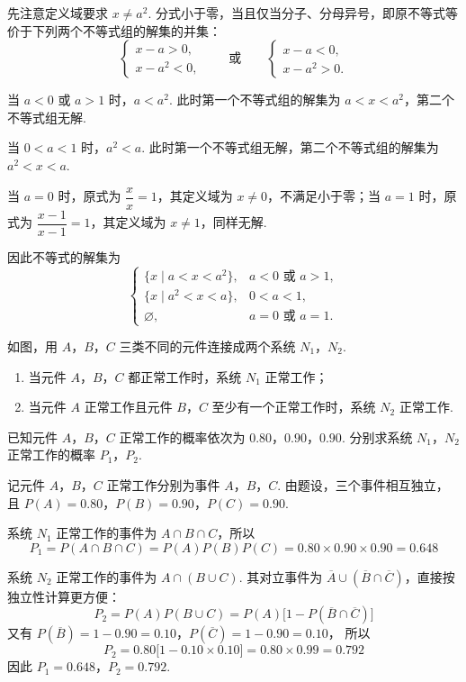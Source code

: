 \begin{solution}
先注意定义域要求 \(x\ne a^2\). 分式小于零，当且仅当分子、分母异号，即原不等式等价于下列两个不等式组的解集的并集：
\[
\begin{cases}
x-a>0,\\
x-a^2<0,
\end{cases}
\qquad\text{或}\qquad
\begin{cases}
x-a<0,\\
x-a^2>0.
\end{cases}
\]

当 \(a<0\) 或 \(a>1\) 时，\(a<a^2\). 此时第一个不等式组的解集为 \(a<x<a^2\)，第二个不等式组无解.

当 \(0<a<1\) 时，\(a^2<a\). 此时第一个不等式组无解，第二个不等式组的解集为 \(a^2<x<a\).

当 \(a=0\) 时，原式为 \(\dfrac{x}{x}=1\)，其定义域为 \(x\ne0\)，不满足小于零；当 \(a=1\) 时，原式为 \(\dfrac{x-1}{x-1}=1\)，其定义域为 \(x\ne1\)，同样无解.

因此不等式的解集为
\[
\begin{cases}
\{x\mid a<x<a^2\},&a<0\text{ 或 }a>1,\\
\{x\mid a^2<x<a\},&0<a<1,\\
\varnothing,&a=0\text{ 或 }a=1.
\end{cases}
\]
\end{solution}

\begin{problem}
如图，用 \(A\)，\(B\)，\(C\) 三类不同的元件连接成两个系统 \(N_1\)，\(N_2\).

\begin{enumerate}
\item 当元件 \(A\)，\(B\)，\(C\) 都正常工作时，系统 \(N_1\) 正常工作；
\item 当元件 \(A\) 正常工作且元件 \(B\)，\(C\) 至少有一个正常工作时，系统 \(N_2\) 正常工作.
\end{enumerate}

已知元件 \(A\)，\(B\)，\(C\) 正常工作的概率依次为 \(0.80\)，\(0.90\)，\(0.90\). 分别求系统 \(N_1\)，\(N_2\) 正常工作的概率 \(P_1\)，\(P_2\).

\begingroup
\leftskip=0pt\relax
\rightskip=0pt\relax
{}
\endgroup
\end{problem}

\begin{solution}
记元件 \(A\)，\(B\)，\(C\) 正常工作分别为事件 \(A\)，\(B\)，\(C\). 由题设，三个事件相互独立，且
\(P(A)=0.80\)，\(P(B)=0.90\)，\(P(C)=0.90\).

系统 \(N_1\) 正常工作的事件为 \(A\cap B\cap C\)，所以
\[
P_1=P(A\cap B\cap C)=P(A)P(B)P(C)=0.80\times0.90\times0.90=0.648
\]

系统 \(N_2\) 正常工作的事件为 \(A\cap(B\cup C)\). 其对立事件为 \(\overline A\cup(\overline B\cap\overline C)\)，直接按独立性计算更方便：
\[
P_2=P(A)P(B\cup C)=P(A)\bigl[1-P(\overline B\cap\overline C)\bigr]
\]
又有
\(P(\overline B)=1-0.90=0.10\)，\(P(\overline C)=1-0.90=0.10\)，
所以
\[
P_2=0.80\bigl[1-0.10\times0.10\bigr]=0.80\times0.99=0.792
\]
因此 \(P_1=0.648\)，\(P_2=0.792\).
\end{solution}


